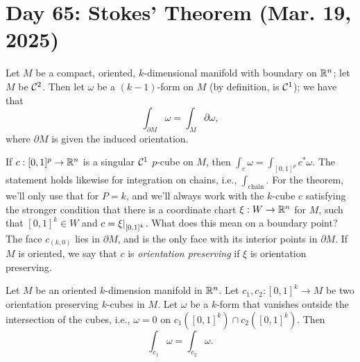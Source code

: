 \section{Day 65: Stokes' Theorem (Mar. 19, 2025)}
\begin{simplethm}
    Let $M$ be a compact, oriented, $k$-dimensional manifold with boundary on $\mathbb R^n$; let $M$ be $\mathcal C^2$. Then let $\omega$ be a $(k-1)$-form on $M$ (by definition, is $\mathcal C^1$); we have that
    \[ \int_{\partial M} \omega = \int_M \partial \omega, \]
    where $\partial M$ is given the induced orientation.
\end{simplethm}
\noindent If $c : [0, 1]^p \to \mathbb R^n$ is a singular $\mathcal C^1$ $p$-cube on $M$, then $\int_c \omega = \int_{[0, 1]^p} c^\ast \omega$. The statement holds likewise for integration on chains, i.e., $\int_{\mathrm{chain}}$. For the theorem, we'll only use that for $P = k$, and we'll always work with the $k$-cube $c$ satisfying the stronger condition that there is a coordinate chart $\xi : W \to \mathbb R^n$ for $M$, such that $[0, 1]^k \in W$ and $c = \restr{\xi}{[0, 1]^k}$.
\medskip\newline
What does this mean on a boundary point? The face $c_{(k, 0)}$ lies in $\partial M$, and is the only face with its interior points in $\partial M$. If $M$ is oriented, we say that $c$ is \textit{orientation preserving} if $\xi$ is orientation preserving.
\begin{simplelemma}[Spivak 5-4]
    Let $M$ be an oriented $k$-dimension manifold in $\mathbb R^n$. Let $c_1, c_2 : [0, 1]^k \to M$ be two orientation preserving $k$-cubes in $M$. Let $\omega$ be a $k$-form that vanishes outside the intersection of the cubes, i.e., $\omega = 0$ on $c_1([0, 1]^k) \cap c_2([0, 1]^k)$. Then
    \[ \int_{c_1} \omega = \int_{c_2} \omega. \]
\end{simplelemma}
